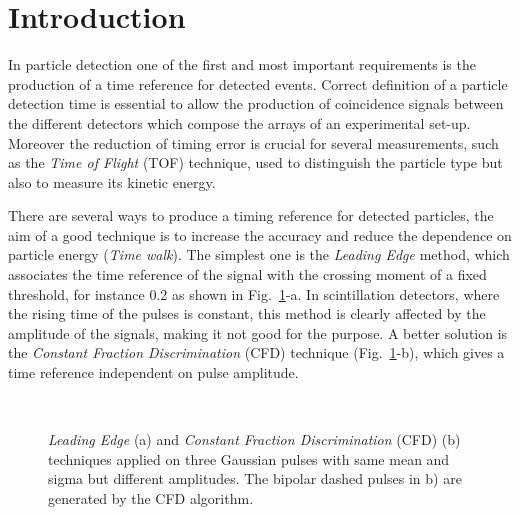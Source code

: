 \section*{Introduction}
In particle detection one of the first and most important requirements is the production of a time reference for detected events. Correct definition of a particle detection time  is essential to allow the production of coincidence signals between the different detectors which compose the arrays of an experimental set-up. Moreover the reduction of timing error  is crucial for several measurements, such as the \textit{Time of Flight} (TOF) technique, used to distinguish the particle type but also to measure its kinetic energy.

There are several ways to produce a timing reference for detected particles, the aim of a good technique is to increase the accuracy and reduce the dependence on particle energy (\textit{Time walk}).
The simplest one is the \textit{Leading Edge} method, which associates the time reference of the signal with the crossing moment of a fixed threshold, for instance 0.2 as shown in Fig.~\ref{fig:LE-CFD}-a. In scintillation detectors, where the rising time of the pulses is constant, this method is clearly affected by the amplitude of the signals, making it not good for the purpose. 
A better solution is the \textit{Constant Fraction Discrimination} (CFD) technique (Fig.~\ref{fig:LE-CFD}-b), which gives a time reference independent on pulse amplitude.
\begin{figure}[h!]
	\centering
	 \quad
	 \\
	\caption{\textit{Leading Edge} (a) and \textit{Constant Fraction Discrimination} (CFD) (b) techniques applied on three Gaussian pulses with same mean and sigma but different amplitudes. The bipolar dashed pulses in b) are generated by the CFD algorithm.}
	\label{fig:LE-CFD}
\end{figure}

